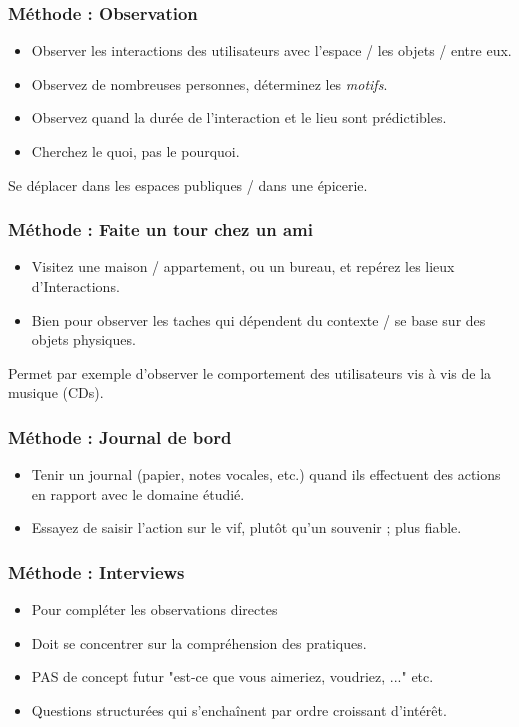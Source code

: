 \documentclass{beamer}
\begin{document}
\begin{frame}
\frametitle{Méthode : Observation}

\begin{itemize}
	\item Observer les interactions des utilisateurs avec l'espace / les objets / entre eux.
	\item Observez de nombreuses personnes, déterminez les \emph{motifs}.
	\item Observez quand la durée de l'interaction et le lieu sont prédictibles.
	\item Cherchez le quoi, pas le pourquoi.
\end{itemize}

Se déplacer dans les espaces publiques / dans une épicerie.
\end{frame}

\begin{frame}
\frametitle{Méthode : Faite un tour chez un ami}
\begin{itemize}
	\item Visitez une maison / appartement, ou un bureau, et repérez les lieux d’Interactions.
	\item Bien pour observer les taches qui dépendent du contexte / se base sur des objets physiques.
\end{itemize}

Permet par exemple d'observer le comportement des utilisateurs vis à vis de la musique (CDs).
\end{frame}

\begin{frame}
\frametitle{Méthode : Journal de bord}
\begin{itemize}
	\item Tenir un journal (papier, notes vocales, etc.) quand ils effectuent des actions en rapport avec le domaine étudié.
	\item Essayez de saisir l'action sur le vif, plutôt qu'un souvenir ; plus fiable.
\end{itemize}
\end{frame}

\begin{frame}
\frametitle{Méthode : Interviews}

\begin{itemize}
	\item Pour compléter les observations directes
	\item Doit se concentrer sur la compréhension des pratiques.
	\item PAS de concept futur "est-ce que vous aimeriez, voudriez, ..." etc.
	\item Questions structurées qui s’enchaînent par ordre croissant d’intérêt.
\end{itemize}
\end{frame}
\end{document}
